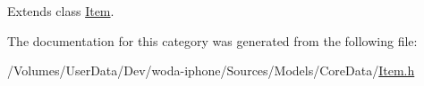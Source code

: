 Extends class \hyperlink{interface_item_a65de6c233583e2427fdf1a8e0fb3f449}{Item}.



The documentation for this category was generated from the following file\-:\begin{DoxyCompactItemize}
\item 
/\-Volumes/\-User\-Data/\-Dev/woda-\/iphone/\-Sources/\-Models/\-Core\-Data/\hyperlink{_item_8h}{Item.\-h}\end{DoxyCompactItemize}
